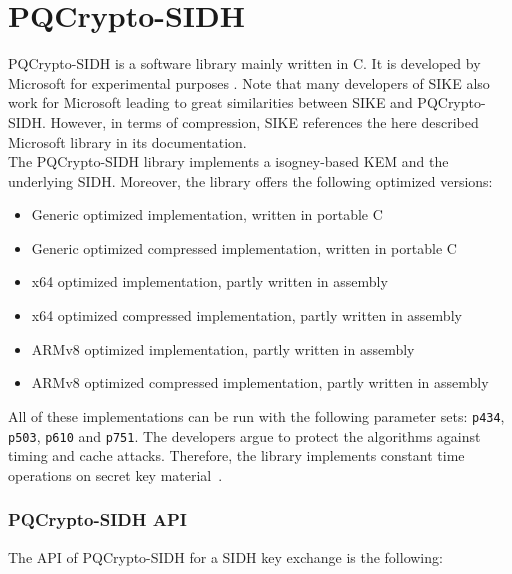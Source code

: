 \section{PQCrypto-SIDH}
PQCrypto-SIDH is a software library mainly written in C. It is developed by Microsoft for experimental purposes \parencite{microsoft2020sidh}. Note that many developers of SIKE also work for Microsoft leading to great similarities between SIKE and PQCrypto-SIDH. However, in terms of compression, SIKE references  the here described Microsoft library in its documentation.\\
The PQCrypto-SIDH library implements a isogney-based KEM and the underlying SIDH. Moreover, the library offers the following optimized versions:
\begin{itemize}
  \item Generic optimized implementation, written in portable C
  \item Generic optimized compressed implementation, written in portable C
  \item x64 optimized implementation, partly written in assembly
  \item x64 optimized compressed implementation, partly written in assembly
  \item ARMv8 optimized implementation, partly written in assembly
  \item ARMv8 optimized compressed implementation, partly written in assembly
\end{itemize}
All of these implementations can be run with the following parameter sets: \texttt{p434}, \texttt{p503}, \texttt{p610} and \texttt{p751}. The developers argue to protect the algorithms against timing and cache attacks. Therefore, the library implements constant time operations on secret key material~\parencite{microsoft2020sidh}.
\subsubsection{PQCrypto-SIDH API}
The API of PQCrypto-SIDH for a SIDH key exchange is the following:

